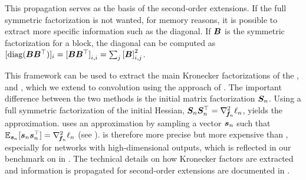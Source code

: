 This propagation serves as the basis of the second-order extensions. If the full
symmetric factorization is not wanted, for memory reasons, it is possible to
extract more specific information such as the diagonal. If ${\bm{B}}$ is the
symmetric factorization for a \GGN%
block, the diagonal can be computed as $[\operatorname{diag}({\bm{B}}{\bm{B}}^\top)]_{i} =
{[{\bm{B}}{\bm{B}}^\top]}_{i,i} = \sum_j {[{\bm{B}}]}_{i,j}^2$.

This framework can be used to extract the main Kronecker factorizations of the
\GGN, \KFAC%
and \KFLR, which we extend to convolution using the approach of
\citet{grosse2016kronecker}. The important difference between the two methods is
the initial matrix factorization ${\bm{S}}_n$. Using a full symmetric factorization
of the initial Hessian, ${\bm{S}}_n{\bm{S}}_n^\top = \nabla_{\!{{\bm{f}}_n}}^{2}\ell_n$, yields
the \KFLR%
approximation. \KFAC%
uses an \MC approximation by sampling a vector ${\bm{s}}_n$ such that
$\mathbb{E}_{{\bm{s}}_n}[{\bm{s}}_n{\bm{s}}_n^\top] = \nabla_{\!{{\bm{f}}_n}}^{2} \ell_n$ (see
). \KFLR%
is therefore more precise but more expensive than \KFAC, especially for networks
with high-dimensional outputs, which is reflected in our benchmark on \CIFARHUN%
in . The technical details on how Kronecker
factors are extracted and information is propagated for second-order \BackPACK%
extensions are documented in .


